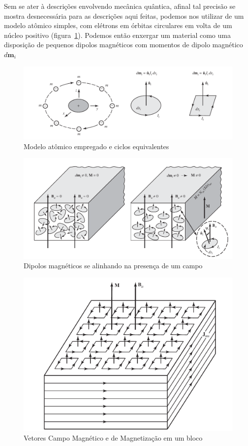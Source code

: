 \documentclass[
        12pt,                           %
        openright,                      %
        twoside,                        %
        a4paper,                        %
        english,                        %
        french,                         %
        spanish,                        %
        brazil                          %
        ]{abntex2}
\begin{document}
Sem se ater à descrições envolvendo mecânica quântica, afinal tal precisão se mostra
desnecessária para as descrições aqui feitas, podemos nos utilizar de um modelo
atômico simples, com elétrons em órbitas circulares em volta de um núcleo positivo
(figura~\ref{fig:chap:embasamento:3}). Podemos então enxergar um material como uma
disposição de pequenos dipolos magnéticos com momentos de dipolo magnético $d \bm{m}_i$

\begin{figure}[htp]
  \centering
  \includegraphics[width=0.9\columnwidth]{balanis3.png}
  \caption{Modelo atômico empregado e ciclos equivalentes \cite{book:balanis}}
  \label{fig:chap:embasamento:3}
\end{figure}

\begin{figure}[htp]
  \centering
  \includegraphics[width=0.9\columnwidth]{balanis2.png}
  \caption{Dipolos magnéticos se alinhando na presença de um campo \cite{book:balanis}}
  \label{fig:chap:embasamento:4}
\end{figure}

\begin{figure}[htp]
  \centering
  \includegraphics[width=0.9\columnwidth]{balanis.png}
  \caption{Vetores Campo Magnético e de Magnetização em um bloco \cite{book:balanis}}
  \label{fig:chap:embasamento:5}
\end{figure}
\end{document}
